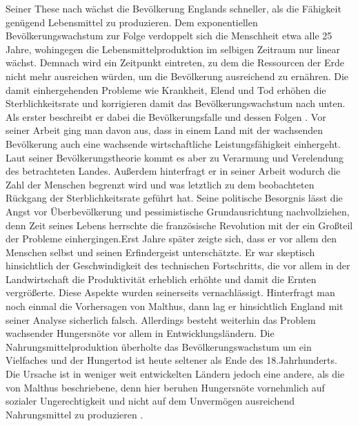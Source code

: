 Seiner These nach w{\"a}chst die Bev{\"o}lkerung Englands schneller, als die F{\"a}higkeit gen{\"u}gend Lebensmittel zu produzieren. Dem exponentiellen Bev{\"o}lkerungswachstum zur Folge verdoppelt sich die Menschheit etwa alle 25 Jahre, wohingegen die Lebensmittelproduktion im selbigen Zeitraum nur linear w{\"a}chst. Demnach wird ein Zeitpunkt eintreten, zu dem die Ressourcen der Erde nicht mehr ausreichen w{\"u}rden, um die Bev{\"o}lkerung ausreichend zu ern{\"a}hren. Die damit einhergehenden Probleme wie Krankheit, Elend und Tod erh{\"o}hen die Sterblichkeitsrate und korrigieren damit das Bev{\"o}lkerungswachstum nach unten. Als erster beschreibt er dabei die Bev{\"o}lkerungsfalle und dessen Folgen \citep{Malthus.1798}. \newline Vor seiner Arbeit ging man davon aus, dass in einem Land mit der wachsenden Bev{\"o}lkerung auch eine wachsende wirtschaftliche Leistungsf{\"a}higkeit einhergeht. Laut seiner Bev{\"o}lkerungstheorie kommt es aber zu Verarmung und Verelendung des betrachteten Landes. Au{\ss}erdem hinterfragt er in seiner Arbeit wodurch die Zahl der Menschen begrenzt wird und was letztlich zu dem beobachteten R{\"u}ckgang der Sterblichkeitsrate gef{\"u}hrt hat. Seine politische Besorgnis l{\"a}sst die Angst vor {\"U}berbev{\"o}lkerung und pessimistische Grundausrichtung nachvollziehen, denn Zeit seines Lebens herrschte die franz{\"o}sische Revolution mit der ein Gro{\ss}teil der Probleme einhergingen.\newline Erst Jahre sp{\"a}ter zeigte sich, dass er vor allem den Menschen selbst und seinen Erfindergeist untersch{\"a}tzte. Er war skeptisch hinsichtlich der Geschwindigkeit des technischen Fortschritts, die vor allem in der Landwirtschaft die Produktivit{\"a}t erheblich erh{\"o}hte und damit die Ernten vergr{\"o}{\ss}erte. Diese Aspekte wurden seinerseits vernachl{\"a}ssigt. \newline Hinterfragt man noch einmal die Vorhersagen von Malthus, dann lag er hinsichtlich England mit seiner Analyse sicherlich falsch. Allerdings besteht weiterhin das Problem wachsender Hungersn{\"o}te vor allem in Entwicklungsl{\"a}ndern. Die Nahrungsmittelproduktion {\"u}berholte das Bev{\"o}lkerungswachstum um ein Vielfaches und der Hungertod ist heute seltener als Ende des 18.Jahrhunderts. Die Ursache ist in weniger weit entwickelten L{\"a}ndern jedoch eine andere, als die von Malthus beschriebene, denn hier beruhen Hungersn{\"o}te vornehmlich auf sozialer Ungerechtigkeit und nicht auf dem Unverm{\"o}gen ausreichend Nahrungsmittel zu produzieren \citep{Hesselbein.2000}.


